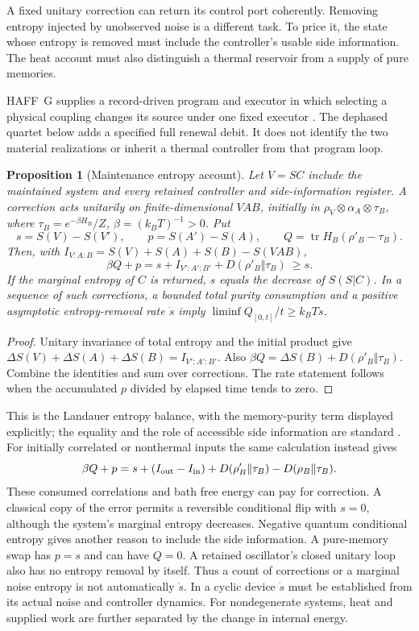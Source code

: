 \documentclass[12pt,a4paper]{article}
\newtheorem{proposition}[theorem]{Proposition}
\begin{document}
A fixed unitary correction can return its control port coherently. Removing entropy
injected by unobserved noise is a different task. To price it, the state whose entropy
is removed must include the controller's usable side information. The heat account
must also distinguish a thermal reservoir from a supply of pure memories.

HAFF~G supplies a record-driven program and executor in which selecting
a physical coupling changes its source under one fixed executor
\cite{Liu2026PaperG}. The dephased quartet below adds a specified full
renewal debit. It does not identify the two material realizations or
inherit a thermal controller from that program loop.

\begin{proposition}[Maintenance entropy account]\label{prop:entropyaccount}
Let $V=SC$ include the maintained system and every retained controller and
side-information register. A correction acts unitarily on finite-dimensional
$VAB$, initially in $\rho_V\otimes\alpha_A\otimes\tau_B$, where
$\tau_B=e^{-\beta H_B}/Z$, $\beta=(k_BT)^{-1}>0$. Put
\[
 s=S(V)-S(V'),\qquad p=S(A')-S(A),\qquad
 Q=\operatorname{tr}H_B(\rho'_B-\tau_B).
\]
Then, with $I_{V:A:B}=S(V)+S(A)+S(B)-S(VAB)$,
\begin{equation}
 \beta Q+p=s+I_{V':A':B'}+D(\rho'_B\Vert\tau_B)\ \ge s.
 \label{eq:entropyaccount}
\end{equation}
If the marginal entropy of $C$ is returned, $s$ equals the decrease of
$S(S|C)$. In a sequence of such corrections, a bounded total purity consumption
and a positive asymptotic entropy-removal rate $\dot s$ imply
$\liminf Q_{[0,t]}/t\ge k_BT\dot s$.
\end{proposition}
\begin{proof}
Unitary invariance of total entropy and the initial product give
$\Delta S(V)+\Delta S(A)+\Delta S(B)=I_{V':A':B'}$.
Also $\beta Q=\Delta S(B)+D(\rho'_B\Vert\tau_B)$.
Combine the identities and sum over corrections. The rate statement follows when
the accumulated $p$ divided by elapsed time tends to zero.
\end{proof}

This is the Landauer entropy balance, with the memory-purity term displayed
explicitly; the equality and the role of accessible side information are standard
\cite[Theorem~3 and Section~5.1]{ReebWolf2014}. For initially correlated or
nonthermal inputs the same calculation instead gives
\[
 \beta Q+p=s+(I_{\rm out}-I_{\rm in})+
 D(\rho'_B\Vert\tau_B)-D(\rho_B\Vert\tau_B).
\]
These consumed correlations and bath free energy can pay for correction. A classical
copy of the error permits a reversible conditional flip with $s=0$, although the
system's marginal entropy decreases. Negative quantum conditional entropy gives
another reason to include the side information. A pure-memory swap has $p=s$ and
can have $Q=0$. A retained oscillator's closed unitary loop also has no entropy
removal by itself. Thus a count of corrections or a marginal noise entropy is not
automatically $\dot s$. In a cyclic device $\dot s$ must be established from its
actual noise and controller dynamics. For nondegenerate systems, heat and supplied
work are further separated by the change in internal energy.
\end{document}
